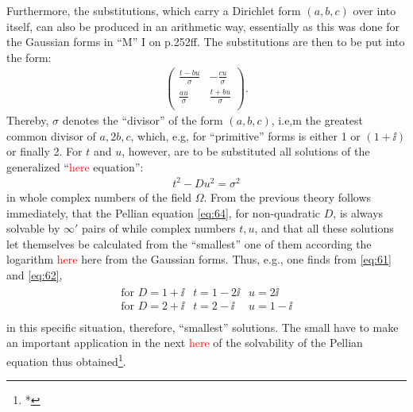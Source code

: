 Furthermore, the substitutions, which carry a Dirichlet form $(a,b,c)$ over into itself, can also be produced in an arithmetic way, essentially as this was done for the Gaussian forms in “M” I on p.252ff. The substitutions are then to be put into the form:
\begin{align}
    \left(\begin{array}{cc}
    \frac{t-bu}{\sigma} & -\frac{cu}{\sigma}\\
    \frac{au}{\sigma} & \frac{t+bu}{\sigma}\\
    \end{array}\right).
\end{align}
Thereby, $\sigma$ denotes the “divisor” of the form $(a,b,c)$, i.e,m the greatest common divisor of $a, 2b, c$, which, e.g, for “primitive” forms is either 1 or $(1+\ii)$ or finally 2. For $t$ and $u$, however, are to be substituted all solutions of the generalized “\textcolor{red}{here} equation”:
\begin{align}\label{eq:64}
    t^2-Du^2=\sigma^2
\end{align}
in whole complex numbers of the field $\Omega$. From the previous theory follows immediately, that the Pellian equation \ref{eq:64}, for non-quadratic $D$, is always solvable by $\infty'$ pairs of while complex numbers $t, u$, and that all these solutions let themselves be calculated from the “smallest” one of them according the logarithm \textcolor{red}{here} here from the Gaussian forms. Thus, e.g., one finds from \ref{eq:61} and \ref{eq:62},
\begin{align}
\begin{array}{ccc}
    \text{for }D=1+\ii & t=1-2\ii &u=2\ii\\
    \text{for }D=2+\ii & t=2-\ii & u=1-\ii\\
\end{array}
\end{align}
in this specific situation, therefore, “smallest” solutions. The small have to make an important application in the next \textcolor{red}{here} of the solvability of the Pellian equation thus obtained\footnote{*}.

